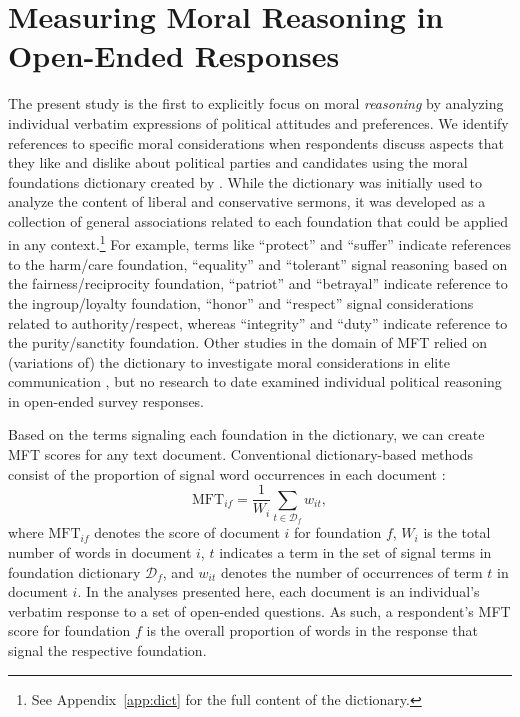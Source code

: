 \documentclass[12pt]{article}
\begin{document}
\section*{Measuring Moral Reasoning in Open-Ended Responses}

The present study is the first to explicitly focus on moral \textit{reasoning} by analyzing individual verbatim expressions of political attitudes and preferences. We identify references to specific moral considerations when respondents discuss aspects that they like and dislike about political parties and candidates using the moral foundations dictionary created by \citet{graham2009liberals}. While the dictionary was initially used to analyze the content of liberal and conservative sermons, it was developed as a collection of general associations related to each foundation that could be applied in any context.\footnote{See Appendix~\ref{app:dict} for the full content of the dictionary.} For example, terms like ``protect'' and ``suffer'' indicate references to the harm/care foundation, ``equality'' and ``tolerant'' signal reasoning based on the fairness/reciprocity foundation, ``patriot'' and ``betrayal'' indicate reference to the ingroup/loyalty foundation, ``honor'' and ``respect'' signal considerations related to authority/respect, whereas ``integrity'' and ``duty'' indicate reference to the purity/sanctity foundation. Other studies in the domain of MFT relied on (variations of) the dictionary to investigate moral considerations in elite communication \citep[e.g. in news media coverage about stem cell research, c.f.,][]{clifford2013words}, but no research to date examined individual political reasoning in open-ended survey responses.

Based on the terms signaling each foundation in the dictionary, we can create MFT scores for any text document. Conventional dictionary-based methods consist of the proportion of signal word occurrences in each document \citep[e.g.][]{graham2009liberals}:
\begin{equation}
\text{MFT}_{if} = \dfrac{1}{W_i} \sum_{t \in \mathcal{D}_f} w_{it},
\end{equation}
where $\text{MFT}_{if}$ denotes the score of document $i$ for foundation $f$, $W_i$ is the total number of words in document $i$, $t$ indicates a term in the set of signal terms in foundation dictionary $\mathcal{D}_f$, and $w_{it}$ denotes the number of occurrences of term $t$ in document $i$. In the analyses presented here, each document is an individual's verbatim response to a set of open-ended questions. As such, a respondent's MFT score for foundation $f$ is the overall proportion of words in the response that signal the respective foundation.
\end{document}
